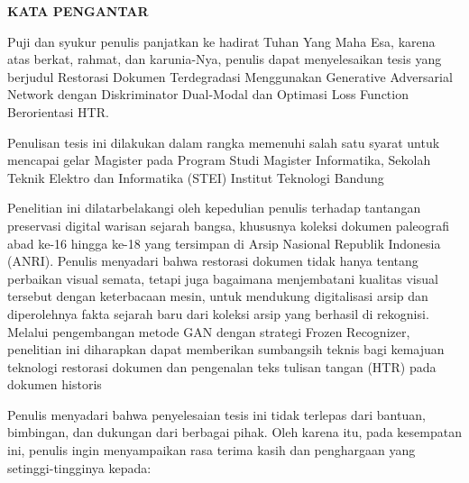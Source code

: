 \newpage
\vspace{3cm}
\begin{center}
{\fontsize{14}{16.8}\selectfont\textbf{KATA PENGANTAR}}\\[1em]
\end{center}
\vspace{1em}

\setlength{\parskip}{0.5\baselineskip}

Puji dan syukur penulis panjatkan ke hadirat Tuhan Yang Maha Esa, karena atas berkat, rahmat, dan karunia-Nya, penulis dapat menyelesaikan tesis yang berjudul Restorasi Dokumen Terdegradasi Menggunakan Generative Adversarial Network dengan Diskriminator Dual-Modal dan Optimasi Loss Function Berorientasi HTR.

Penulisan tesis ini dilakukan dalam rangka memenuhi salah satu syarat untuk mencapai gelar Magister pada Program Studi Magister Informatika, Sekolah Teknik Elektro dan Informatika (STEI) Institut Teknologi Bandung

Penelitian ini dilatarbelakangi oleh kepedulian penulis terhadap tantangan preservasi digital warisan sejarah bangsa, khususnya koleksi dokumen paleografi abad ke-16 hingga ke-18 yang tersimpan di Arsip Nasional Republik Indonesia (ANRI). Penulis menyadari bahwa restorasi dokumen tidak hanya tentang perbaikan visual semata, tetapi juga bagaimana menjembatani kualitas visual tersebut dengan keterbacaan mesin, untuk mendukung digitalisasi arsip dan diperolehnya fakta sejarah baru dari koleksi arsip yang berhasil di rekognisi. Melalui pengembangan metode GAN dengan strategi Frozen Recognizer, penelitian ini diharapkan dapat memberikan sumbangsih teknis bagi kemajuan teknologi restorasi dokumen dan pengenalan teks tulisan tangan (HTR) pada dokumen historis

Penulis menyadari bahwa penyelesaian tesis ini tidak terlepas dari bantuan, bimbingan, dan dukungan dari berbagai pihak. Oleh karena itu, pada kesempatan ini, penulis ingin menyampaikan rasa terima kasih dan penghargaan yang setinggi-tingginya kepada:

